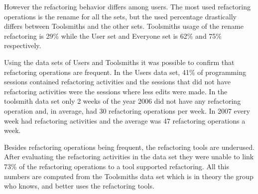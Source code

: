However the refactoring behavior differs among users. The most used refactoring operations is the rename for all the sets, but the used percentage drastically differs between Toolsmiths and the other sets. Toolsmiths usage of the rename refactoring is 29\% while the User set and Everyone set is 62\% and 75\% respectively.

Using the data sets of Users and Toolsmiths it was possible to confirm that refactoring operations are frequent. 
In the Users data set, 41\% of programming sessions contained refactoring activities and the sessions that did not have refactoring activities were the sessions where less edits were made.
In the toolsmith data set only 2 weeks of the year 2006 did not have any refactoring operation and, in average, had 30 refactoring operations per week. 
In 2007 every week had refactoring activities and the average was 47 refactoring operations a week.

Besides refactoring operations being frequent, the refactoring tools are underused. 
After evaluating the refactoring activities in the data set they were unable to link 73\% of the refactoring operations to a tool supported refactoring. 
All this numbers are computed from the Toolsmiths data set which is in theory the group who knows, and better uses the refactoring tools.


